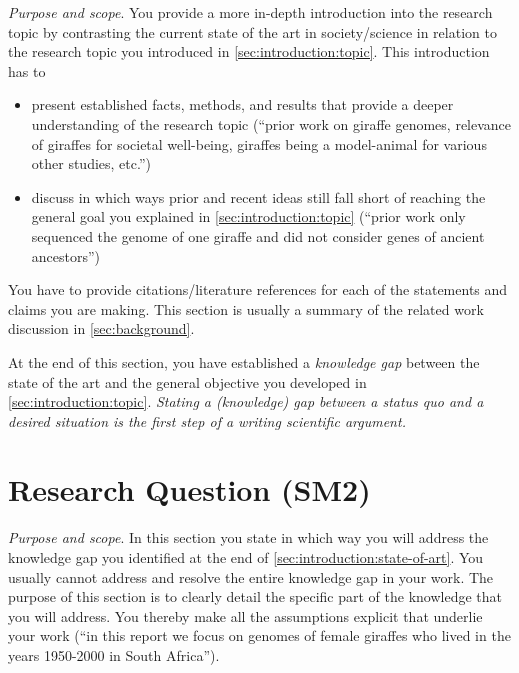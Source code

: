 \documentclass[
  fontsize=10pt,
  numbers=noenddot,
  english,  %
  paper=a5,
  twoside,  %
  DIV=calc,
  headings=small,
  bibliography=totoc,
  listof=totoc,
  draft=false
]{scrbook}
\theoremstyle{break}
\begin{document}
\emph{Purpose and scope}.
You provide a more in-depth introduction into the research topic by contrasting the current state of the art in society/science in relation to the research topic you introduced in \cref{sec:introduction:topic}.
This introduction has to

\begin{itemize}
  \item present established facts, methods, and results that provide a deeper understanding of the research topic (``prior work on giraffe genomes, relevance of giraffes for societal well-being, giraffes being a model-animal for various other studies, etc.'')
  \item discuss in which ways prior and recent ideas still fall short of reaching the general goal you explained in \cref{sec:introduction:topic} (``prior work only sequenced the genome of one giraffe and did not consider genes of ancient ancestors'')
\end{itemize}

You have to provide citations/literature references for each of the statements and claims you are making.
This section is usually a summary of the related work discussion in \cref{sec:background}.

At the end of this section, you have established a \emph{knowledge gap} between the state of the art and the general objective you developed in \cref{sec:introduction:topic}.
\emph{Stating a (knowledge) gap between a status quo and a desired situation is the \emph{first step} of a writing scientific argument.}


\section{Research Question (SM2)}\label{sec:introduction:research-question}

\emph{Purpose and scope}.
In this section you state in which way you will address the knowledge gap you identified at the end of \cref{sec:introduction:state-of-art}.
You usually cannot address and resolve the entire knowledge gap in your work.
The purpose of this section is to clearly detail the specific part of the knowledge that you will address.
You thereby make all the assumptions explicit that underlie your work (``in this report we focus on genomes of female giraffes who lived in the years 1950-2000 in South Africa'').
\end{document}
